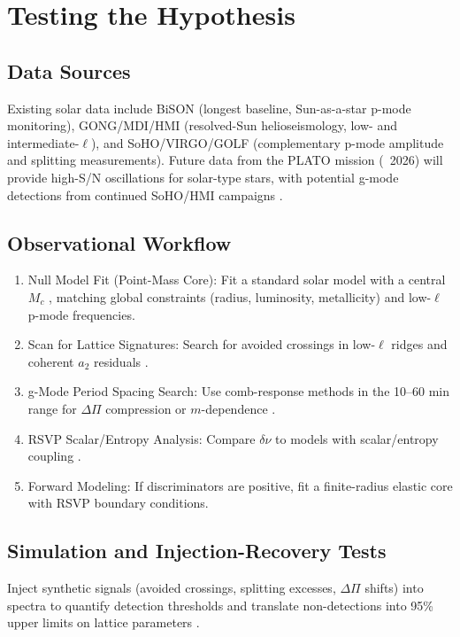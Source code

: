 \documentclass{article}
\begin{document}
\section{Testing the Hypothesis}

\subsection{Data Sources}

Existing solar data include BiSON (longest baseline, Sun-as-a-star p-mode monitoring), GONG/MDI/HMI (resolved-Sun helioseismology, low- and intermediate-$\ell$), and SoHO/VIRGO/GOLF (complementary p-mode amplitude and splitting measurements). Future data from the PLATO mission (~2026) will provide high-S/N oscillations for solar-type stars, with potential g-mode detections from continued SoHO/HMI campaigns \citep{lund2017}.

\subsection{Observational Workflow}

\begin{enumerate}
\item Null Model Fit (Point-Mass Core): Fit a standard solar model with a central $M_c$ \citep{bellinger2025}, matching global constraints (radius, luminosity, metallicity) and low-$\ell$ p-mode frequencies.
\item Scan for Lattice Signatures: Search for avoided crossings in low-$\ell$ ridges and coherent $a_2$ residuals \citep{aerts2010, lund2017}.
\item g-Mode Period Spacing Search: Use comb-response methods in the 10--60 min range for $\Delta \Pi$ compression or $m$-dependence \citep{bellinger2025}.
\item RSVP Scalar/Entropy Analysis: Compare $\delta \nu$ to models with scalar/entropy coupling \citep{kunitomo2022}.
\item Forward Modeling: If discriminators are positive, fit a finite-radius elastic core with RSVP boundary conditions.
\end{enumerate}

\subsection{Simulation and Injection-Recovery Tests}

Inject synthetic signals (avoided crossings, splitting excesses, $\Delta \Pi$ shifts) into spectra to quantify detection thresholds and translate non-detections into 95\% upper limits on lattice parameters \citep{lund2017}.
\end{document}
